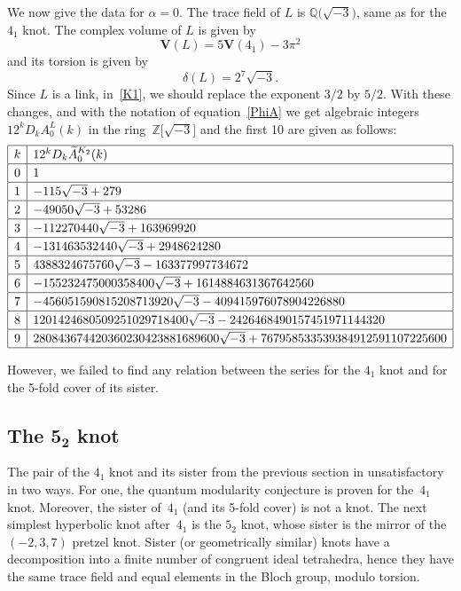 \documentclass[pdftex]{sigma}
\numberwithin{equation}{section}
\def\BZ{\mathbb Z}
\def\BQ{\mathbb Q}
\def\wt{\widetilde}
\def\a{\alpha}
\def\a{\alpha}
\def\V{\mathbf V}
\def\tiA{\wt A}
\begin{document}
We now give the data for $\a=0$. The trace field of $L$ is $\BQ\big(\sqrt{-3}\big)$,
same as for the $4_1$ knot. The complex volume of $L$ is given by
\[
\V(L)=5  \V(4_1) -3\pi^2 %
\]
and its torsion is given by
\[
\delta(L) = 2^7 \sqrt{-3} .
\]
Since $L$ is a link, in~\eqref{K1}, we should replace the exponent
$3/2$ by $5/2$. With these changes, and with the notation of
equation~\eqref{PhiA} we get algebraic integers
$12^k D_k A^{L}_{0}(k)$ in the ring~$\BZ\big[\sqrt{-3}\big]$ and the first
10 are given as follows:
 $$
 \def\arraystretch{1.2}
\begin{array}{|c|l|} \hline
k & 12^{k}  D_k  \tiA^{K_2}_{0}(k) \\ \hline
0 & 1
\\ \hline
1 & -115 \sqrt{-3} + 279
\\ \hline
2 & -49050 \sqrt{-3} + 53286
\\ \hline
3 & -112270440 \sqrt{-3} + 163969920
\\ \hline
4 & -131463532440 \sqrt{-3} + 2948624280
\\ \hline
5 & 4388324675760 \sqrt{-3} - 163377997734672
\\ \hline
6 & -155232475000358400 \sqrt{-3} + 1614884631367642560
\\ \hline
7 & -456051590815208713920 \sqrt{-3} - 409415976078904226880
\\ \hline
8 & 1201424680509251029718400 \sqrt{-3} - 2426468490157451971144320
\\ \hline
9 & 280843674420360230423881689600 \sqrt{-3} + 767958533539384912591107225600
\\ \hline
\end{array}
$$


However, we failed to find any relation between the series for the
$4_1$ knot and for the 5-fold cover of its sister.

\subsection[The 5\_2 knot]{The $\boldsymbol{5_2}$ knot}
\label{sub.52}

The pair of the $4_1$ knot and its sister from the previous section in
unsatisfactory in two ways. For one, the quantum modularity conjecture is
proven for the~$4_1$ knot.
Moreover, the sister of~$4_1$ (and its 5-fold cover) is not a knot.
The next simplest hyperbolic knot after~$4_1$ is the $5_2$ knot,
whose sister is the mirror of the $(-2,3,7)$ pretzel knot. Sister (or
geometrically similar) knots have a decomposition into a finite number of
congruent ideal tetrahedra, hence they have the same trace field
and equal elements in the Bloch group, modulo torsion.
\end{document}
